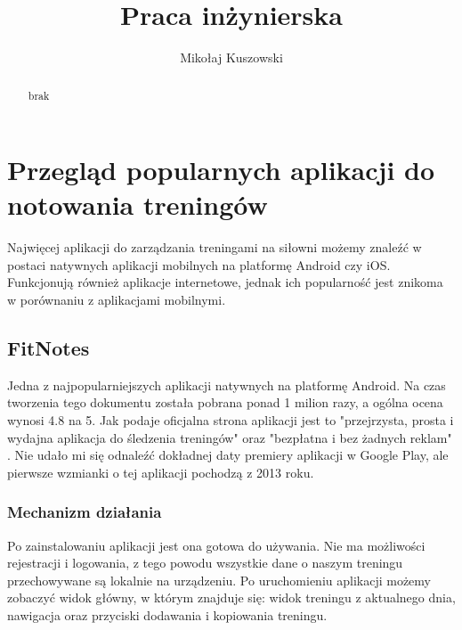 \documentclass{article}
\title{Praca inżynierska}
\author{Mikołaj Kuszowski}
\begin{document}
\maketitle

\begin{abstract}
      brak
\end{abstract}

\section{Przegląd popularnych aplikacji do notowania treningów}
      Najwięcej aplikacji do zarządzania treningami na siłowni możemy znaleźć w postaci natywnych aplikacji mobilnych na platformę Android czy iOS. Funkcjonują również aplikacje internetowe, jednak ich popularność jest znikoma w porównaniu z aplikacjami mobilnymi.

      \subsection{FitNotes}
            Jedna z najpopularniejszych aplikacji natywnych na platformę Android. Na czas tworzenia tego dokumentu została pobrana ponad 1 milion razy, a ogólna ocena wynosi 4.8 na 5. Jak podaje oficjalna strona aplikacji jest to "przejrzysta, prosta i wydajna aplikacja do śledzenia treningów" oraz "bezpłatna i bez żadnych reklam" \cite{FitNotesWeb}. Nie udało mi się odnaleźć dokładnej daty premiery aplikacji w Google Play, ale pierwsze wzmianki o tej aplikacji pochodzą z 2013 roku. 
            \subsubsection*{Mechanizm działania}
                  Po zainstalowaniu aplikacji jest ona gotowa do używania. Nie ma możliwości rejestracji i logowania, z tego powodu wszystkie dane o naszym treningu przechowywane są lokalnie na urządzeniu. Po uruchomieniu aplikacji możemy zobaczyć widok główny, w którym znajduje się: widok treningu z aktualnego dnia, nawigacja oraz przyciski dodawania i kopiowania treningu.
\end{document}
